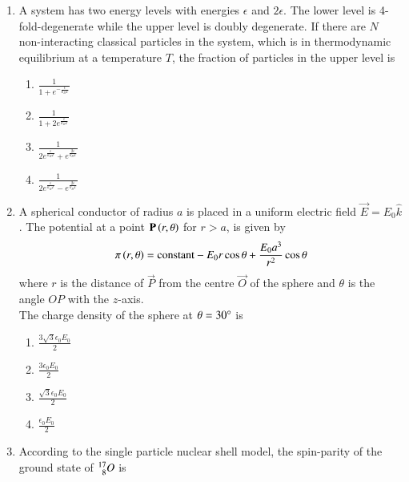 \documentclass[journal]{IEEEtran}
\begin{document}
\begin{enumerate}
\begin{multicols}{4}
\begin{enumerate}
        \item $3k_B \ln N$
        \item $Nk_B \ln 2$
        \item $Nk_B \ln 3$
    \end{enumerate}
\end{multicols}
\item A system has two energy levels with energies $\epsilon$ and $2\epsilon$. The lower level is 4-fold-degenerate while the upper level is doubly degenerate. If there are $N$ non-interacting classical particles in the system, which is in thermodynamic equilibrium at a temperature $T$, the fraction of particles in the upper level is
\begin{multicols}{2}
    \begin{enumerate}
        \item $\frac{1}{1+e^{-\frac{\epsilon}{k_BT}}}$
        \item $\frac{1}{1+2e^{\frac{\epsilon}{k_BT}}}$
        \item $\frac{1}{2e^{\frac{\epsilon}{k_BT}}+e^{\frac{2\epsilon}{k_BT}}}$
        \item $\frac{1}{2e^{\frac{\epsilon}{k_BT}}-e^{\frac{2\epsilon}{k_BT}}}$
    \end{enumerate}
\end{multicols}
\item A spherical conductor of radius $a$ is placed in a uniform electric field $\vec{E}=E_0\hat{k}$. The potential at a point $\mathbf{P}\left(r,\theta\right)$ for $ r>a $, is given by
\begin{align*}
	\pi \left(r,\theta\right)=\text{constant}-E_0r\cos\theta +\frac{E_0a^3}{r^2}\cos\theta
\end{align*}
where $r$ is the distance of $\vec{P}$ from the centre $\vec{O}$ of the sphere and $\theta$ is the angle $OP$ with the $z$-axis.\\

The charge density of the sphere at $\theta = 30\degree$ is
\begin{multicols}{4}
    \begin{enumerate}
        \item $\frac{3\sqrt{3}\epsilon_0E_0}{2}$
        \item $\frac{3\epsilon_0E_0}{2}$
        \item $\frac{\sqrt{3}\epsilon_0E_0}{2}$
        \item $\frac{\epsilon_0E_0}{2}$
    \end{enumerate}
\end{multicols}
\item According to the single particle nuclear shell model, the spin-parity of the ground state of $\prescript{17}{8}{O}$ is

\end{enumerate}
\end{document}
